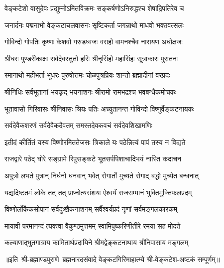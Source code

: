 

\twolineshloka
{वेङ्कटेशो वासुदेवः प्रद्युम्नोऽमितविक्रमः}
{सङ्कर्षणोऽनिरुद्धश्च शेषाद्रिपतिरेव च}

\twolineshloka
{जनार्दनः पद्मनाभो वेङ्कटाचलवासनः}
{सृष्टिकर्ता जगन्नाथो माधवो भक्तवत्सलः}

\twolineshloka
{गोविन्दो गोपतिः कृष्णः केशवो गरुडध्वजः}
{वराहो वामनश्चैव नारायण अधोक्षजः}

\twolineshloka
{श्रीधरः पुण्डरीकाक्षः सर्वदेवस्तुतो हरिः}
{श्रीनृसिंहो महासिंहः सूत्राकारः पुरातनः}

\twolineshloka
{रमानाथो महीभर्ता भूधरः पुरुषोत्तमः}
{चोळपुत्रप्रियः शान्तो ब्रह्मादीनां वरप्रदः}

\twolineshloka
{श्रीनिधिः सर्वभूतानां भयकृद् भयनाशनः}
{श्रीरामो रामभद्रश्च भवबन्धैकमोचकः}

\twolineshloka
{भूतावासो गिरिवासः श्रीनिवासः श्रियः पतिः}
{अच्युतानन्त गोविन्दो विष्णुर्वेङ्कटनायकः}

\twolineshloka
{सर्वदेवैकशरणं सर्वदेवैकदैवतम्}
{समस्तदेवकवचं सर्वदेवशिखामणिः}

\twolineshloka
{इतीदं कीर्तितं यस्य विष्णोरमिततेजसः}
{त्रिकाले यः पठेन्नित्यं पापं तस्य न विद्यते}

\twolineshloka
{राजद्वारे पठेद् घोरे सङ्ग्रामे रिपुसङ्कटे}
{भूतसर्पपिशाचादिभयं नास्ति कदाचन}

\twolineshloka
{अपुत्रो लभते पुत्रान् निर्धनो धनवान् भवेत्}
{रोगार्तो मुच्यते रोगाद् बद्धो मुच्येत बन्धनात्}

\twolineshloka
{यद्यदिष्टतमं लोके तत् तत् प्राप्नोत्यसंशयः}
{ऐश्वर्यं राजसम्मानं भुक्तिमुक्तिफलप्रदम्}

\twolineshloka
{विष्णोर्लोकैकसोपानं सर्वदुःखैकनाशनम्}
{सर्वैश्वर्यप्रदं नॄणां सर्वमङ्गलकारकम्}

\twolineshloka
{मायावी परमानन्दं त्यक्त्वा वैकुण्ठमुत्तमम्}
{स्वामिपुष्करिणीतीरे रमया सह मोदते}

\twolineshloka
{कल्याणाद्भुतगात्राय कामितार्थप्रदायिने}
{श्रीमद्वेङ्कटनाथाय श्रीनिवासाय मङ्गलम्}

॥इति~श्री-ब्रह्माण्डपुराणे~ब्रह्मनारदसंवादे वेङ्कटगिरिमाहात्म्ये श्री-वेङ्कटेश-अष्टकं सम्पूर्णम्॥